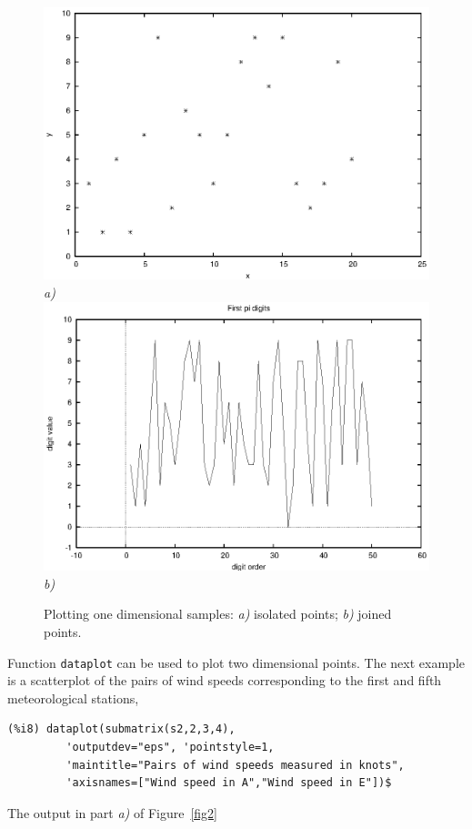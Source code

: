 \documentclass[12pt,a4paper]{article}
\begin{document}
\begin{description}
\begin{figure}
\begin{center}
\includegraphics[scale=1.0]{dataplot1.eps} \\
\emph{a)} \\ 
\includegraphics[scale=1.0]{dataplot2.eps} \\
\emph{b)} \\
\caption{Plotting one dimensional samples: \emph{a)} isolated points; \emph{b)} joined points.}
\label{fig1}
\end{center}
\end{figure}

Function \verb|dataplot| can be used to plot two dimensional points. The next example is a scatterplot of the pairs of wind speeds corresponding to the first and fifth meteorological stations,
\begin{verbatim}
(%i8) dataplot(submatrix(s2,2,3,4),
         'outputdev="eps", 'pointstyle=1,
         'maintitle="Pairs of wind speeds measured in knots",
         'axisnames=["Wind speed in A","Wind speed in E"])$
\end{verbatim}
The output in part \emph{a)} of Figure~\ref{fig2}


\end{description}
\end{document}
